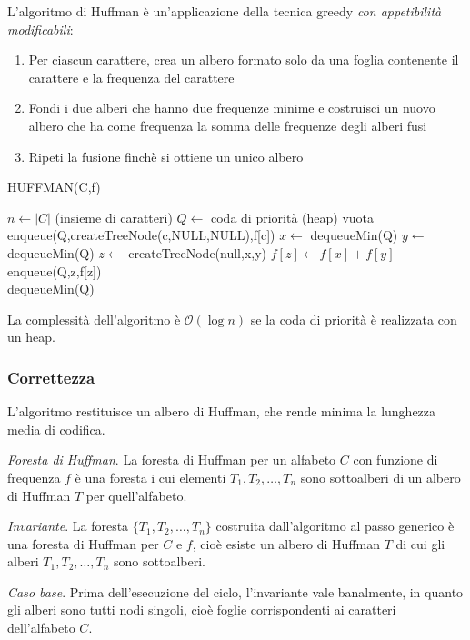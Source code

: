 \documentclass[11pt]{book}
\begin{document}
L'algoritmo di Huffman è un'applicazione della tecnica greedy \textit{con appetibilità modificabili}:
\begin{enumerate}
    \item Per ciascun carattere, crea un albero formato solo da una foglia contenente il carattere e la frequenza del carattere 
    \item Fondi i due alberi che hanno due frequenze minime e costruisci un nuovo albero che ha come frequenza la somma 
    delle frequenze degli alberi fusi 
    \item Ripeti la fusione finchè si ottiene un unico albero 
\end{enumerate}
\begin{algorithm}
    \caption{HUFFMAN(C,f)}
    \begin{algorithmic}
        \State $n\gets |C|$ (insieme di caratteri)
        \State $Q\gets$ coda di priorità (heap) vuota
            \State enqueue(Q,createTreeNode(c,NULL,NULL),f[c])
        \EndFor 
            \State $x\gets$ dequeueMin(Q)
            \State $y \gets$ dequeueMin(Q)
            \State $z \gets$ createTreeNode(null,x,y)
            \State $f[z] \gets f[x]+f[y]$
            \State enqueue(Q,z,f[z])
        \EndFor\\
        \Return dequeueMin(Q)
    \end{algorithmic}
\end{algorithm}
La complessità dell'algoritmo è $\mathcal{O}(\log n)$ se la coda di priorità è realizzata con un heap.
\subsubsection{Correttezza}
L'algoritmo restituisce un albero di Huffman, che rende minima la lunghezza media di codifica.

\textit{Foresta di Huffman}. La foresta di Huffman per un alfabeto $C$ con funzione di frequenza $f$ è una foresta i 
cui elementi $T_1,T_2,\dots,T_n$ sono sottoalberi di un albero di Huffman $T$ per quell'alfabeto.

\textit{Invariante}. La foresta $\{T_1,T_2,\dots,T_n\}$ costruita dall'algoritmo al passo generico è una foresta di 
Huffman per $C$ e $f$, cioè esiste un albero di Huffman $T$ di cui gli alberi $T_1,T_2,\dots,T_n$ sono sottoalberi.

\textit{Caso base}. Prima dell'esecuzione del ciclo, l'invariante vale banalmente, in quanto gli alberi sono tutti 
nodi singoli, cioè foglie corrispondenti ai caratteri dell'alfabeto $C$.
\end{document}

